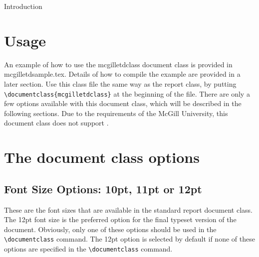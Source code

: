 \documentclass[12pt,Bold,letterpaper,TexShade]{mcgilletdclass}
\begin{document}
{Introduction}

\chapter{Usage}
An example of how to use the mcgilletdclass document class is provided in 
mcgilletdsample.tex. Details of how to compile the example are 
provided in a later section.
Use this class file the same way as the report class, by putting
\verb=\documentclass{mcgilletdclass}= at the beginning of the \LaTeXe file.
There are only a few options available with this document class, which
will be described in the following sections. Due to the requirements of
the McGill University, this document class does not support .

\chapter{The document class options}
\section{Font Size Options: 10pt, 11pt or 12pt}
These are the font sizes that are available in the standard \LaTeXe report 
document class. The 12pt font size is the preferred option for the final 
typeset version of the document. Obviously, only one of these options should 
be used in the \verb=\documentclass= command. The 12pt option is selected by default 
if none of these options are specified in
the \verb=\documentclass= command.
\end{document}
